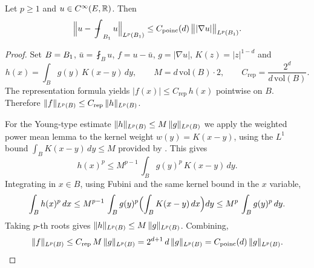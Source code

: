 \begin{theorem}
\label{thm:poincare_smooth_unitBall}
\leanok
{}
Let $p \ge 1$ and $u \in C^{\infty}(E,\mathbb{R})$. Then
\begin{equation*}
\Bigl\lVert u - \fint_{\Bz{1}} u \Bigr\rVert_{\Lp{p}(\Bz{1})}
\le C_{\mathrm{poinc}}(d)\, \bigl\lVert \lvert\nabla u\rvert \bigr\rVert_{\Lp{p}(\Bz{1})}.
\end{equation*}
\end{theorem}
\begin{proof}
\leanok
{}

Set $B = B_{1}$, $\bar u = \fint_B u$, $f = u - \bar u$, $g = \lvert \nabla u\rvert$,
$K(z) = \lvert z\rvert^{1-d}$ and
\begin{equation*}
h(x) = \int_B g(y)\, K(x-y)\, dy,\qquad
M = d\,\mathrm{vol}(B)\cdot 2,\qquad
C_{\mathrm{rep}} = \frac{2^{d}}{d\,\mathrm{vol}(B)}.
\end{equation*}
The representation formula yields $\lvert f(x)\rvert \le C_{\mathrm{rep}}\, h(x)$ pointwise on
$B$. Therefore $\lVert f\rVert_{L^{p}(B)} \le C_{\mathrm{rep}}\,\lVert h\rVert_{L^{p}(B)}$.

For the Young-type estimate $\lVert h\rVert_{L^{p}(B)} \le M\,\lVert g\rVert_{L^{p}(B)}$
we apply the weighted power mean lemma to the kernel weight $w(y) = K(x-y)$, using the
$L^{1}$ bound $\int_B K(x-y)\, dy \le M$ provided by .
This gives
\begin{equation*}
h(x)^{p}
\le M^{p-1}\, \int_B g(y)^{p}\, K(x-y)\, dy.
\end{equation*}
Integrating in $x \in B$, using Fubini and the same kernel bound in the $x$ variable,
\begin{equation*}
\int_B h(x)^{p}\, dx
\le M^{p-1}\, \int_B g(y)^{p}\Bigl(\int_B K(x-y)\, dx\Bigr) dy
\le M^{p}\, \int_B g(y)^{p}\, dy.
\end{equation*}
Taking $p$-th roots gives $\lVert h\rVert_{L^{p}(B)} \le M\,\lVert g\rVert_{L^{p}(B)}$.
Combining,
\begin{equation*}
\lVert f\rVert_{L^{p}(B)}
\le C_{\mathrm{rep}}\, M\, \lVert g\rVert_{L^{p}(B)}
= 2^{d+1}\, d\, \lVert g\rVert_{L^{p}(B)}
= C_{\mathrm{poinc}}(d)\,\lVert g\rVert_{L^{p}(B)}. \qedhere
\end{equation*}
\end{proof}

